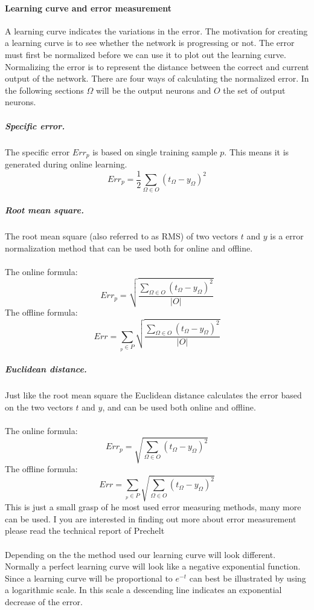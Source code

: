 \documentclass[pdftex,a4paper,12pt,twoside]{report}
\theoremstyle{plain} \newtheorem{theorem}{Theorem} \newtheorem{proposition}{Proposition} \newtheorem{lemma}{Lemma} \newtheorem*{corollary}{Corollary}
\theoremstyle{definition} \newtheorem{definition}{Definition} \newtheorem{conjecture}{Conjecture} \newtheorem*{example}{Example} \newtheorem{algorithm}{Algorithm}
\theoremstyle{remark} \newtheorem*{remark}{Remark} \newtheorem*{note}{Note} \newtheorem{case}{Case}
\begin{document}
\paragraph{Learning curve and error measurement}
A learning curve indicates the variations in the error. The motivation for creating a learning curve is to see whether the network is progressing or not. The error must first be normalized before we can use it to plot out the learning curve. Normalizing the error is to represent the distance between the correct and current output of the network. There are four ways of calculating the normalized error. In the following sections $\Omega$ will be the output neurons and $O$ the set of output neurons.
\subparagraph{Specific error.}
The specific error $Err_p$ is based on single training sample $p$. This means it is generated during online learning.
\begin{equation}
Err_p = \frac{1}{2} \sum_{\Omega \in O}(t_\Omega - y_\Omega)^2
\end{equation}
\subparagraph{Root mean square.}
The root mean square (also referred to as RMS) of two vectors $t$ and $y$ is a error normalization method that can be used both for online and offline.\\\\
The online formula:
\begin{equation}
Err_p =  \sqrt{\frac{\sum_{\Omega \in O}(t_\Omega - y_\Omega)^2}{|O|}}
\end{equation}
The offline formula:
\begin{equation}
Err = \sum_{_{p} \in P}\sqrt{\frac{\sum_{\Omega \in O}(t_\Omega - y_\Omega)^2}{|O|}}
\end{equation}
\subparagraph{Euclidean distance.}
Just like the root mean square the Euclidean distance calculates the error based on the two vectors $t$ and $y$, and can be used both online and offline.\\\\
The online formula:
\begin{equation}
Err_p =  \sqrt{{\sum_{\Omega \in O}(t_\Omega - y_\Omega)^2}}
\end{equation}
The offline formula:
\begin{equation}
Err = \sum_{_{p} \in P}\sqrt{{\sum_{\Omega \in O}(t_\Omega - y_\Omega)^2}}
\end{equation}
This is just a small grasp of he most used error measuring methods, many more can be used. I you are interested in finding out more about error measurement please read the technical report of Prechelt \citep{foobar}\\\\Depending on the the method used our learning curve will look different. Normally a perfect learning curve will look like a negative exponential function. Since a learning curve will be proportional to $e^{-t}$ can best be illustrated by using a logarithmic scale. In this scale a descending line indicates an exponential decrease of the error.
\end{document}
